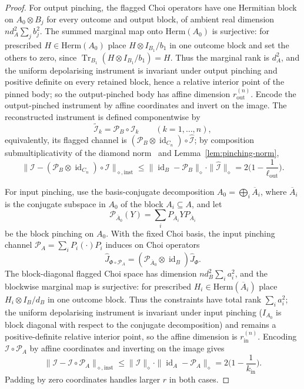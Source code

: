 \documentclass[11pt,a4paper]{article}
\newcommand{\Herm}{\mathrm{Herm}}
\newcommand{\Tr}{\operatorname{Tr}}
\newcommand{\id}{\operatorname{id}}
\newcommand{\Jhat}{\widehat J}
\begin{document}
\begin{proof}
For output pinching, the flagged Choi operators have one Hermitian block on $A_0\otimes B_j$ for every outcome and output block, of ambient real dimension $nd_A^2\sum_jb_j^2$. The summed marginal map onto $\Herm(A_0)$ is surjective: for prescribed $H\in\Herm(A_0)$ place $H\otimes I_{B_1}/b_1$ in one outcome block and set the others to zero, since $\Tr_{B_1}(H\otimes I_{B_1}/b_1)=H$. Thus the marginal rank is $d_A^2$, and the uniform depolarising instrument is invariant under output pinching and positive definite on every retained block, hence a relative interior point of the pinned body; so the output-pinched body has affine dimension $r_{\mathrm{out}}^{(n)}$. Encode the output-pinched instrument by affine coordinates and invert on the image. The reconstructed instrument is defined componentwise by
\[
\widetilde{\mathcal I}_k=\mathcal P_B\circ\mathcal I_k\qquad(k=1,\dots,n),
\]
equivalently, its flagged channel is $(\mathcal P_B\otimes\id_{C_n})\circ\widehat{\mathcal I}$; by composition submultiplicativity of the diamond norm~\cite{Watrous2018} and Lemma~\ref{lem:pinching-norm},
\[
\|\mathcal I-(\mathcal P_B\otimes\id_{C_n})\circ\mathcal I\|_{\diamond,\mathrm{inst}}
\le\|\id_B-\mathcal P_B\|_\diamond\cdot\|\widehat{\mathcal I}\|_\diamond
=2\Big(1-\frac1{\ell_{\mathrm{out}}}\Big).
\]

For input pinching, use the basis-conjugate decomposition $A_0=\bigoplus_i\overline A_i$, where $\overline A_i$ is the conjugate subspace in $A_0$ of the block $A_i\subseteq A$, and let
\[
\mathcal P_{\overline A_0}(Y)=\sum_iP_{\overline A_i}YP_{\overline A_i}
\]
be the block pinching on $A_0$. With the fixed Choi basis, the input pinching channel $\mathcal P_A=\sum_iP_i(\cdot)P_i$ induces on Choi operators
\[
\Jhat_{\Phi\circ\mathcal P_A}=(\mathcal P_{\overline A_0}\otimes\id_B)\Jhat_\Phi.
\]
The block-diagonal flagged Choi space has dimension $nd_B^2\sum_ia_i^2$, and the blockwise marginal map is surjective: for prescribed $H_i\in\Herm(\overline A_i)$ place $H_i\otimes I_B/d_B$ in one outcome block. Thus the constraints have total rank $\sum_ia_i^2$; the uniform depolarising instrument is invariant under input pinching ($I_{A_0}$ is block diagonal with respect to the conjugate decomposition) and remains a positive-definite relative interior point, so the affine dimension is $r_{\mathrm{in}}^{(n)}$. Encoding $\mathcal I\circ\mathcal P_A$ by affine coordinates and inverting on the image gives
\[
\|\mathcal I-\mathcal I\circ\mathcal P_A\|_{\diamond,\mathrm{inst}}
\le\|\widehat{\mathcal I}\|_\diamond\cdot\|\id_A-\mathcal P_A\|_\diamond
=2\Big(1-\frac1{k_{\mathrm{in}}}\Big).
\]
Padding by zero coordinates handles larger $r$ in both cases.
\end{proof}
\end{document}
